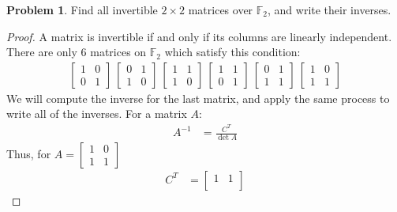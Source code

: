 \documentclass[12pt,reqno]{article}
\newcommand{\F}{\mathbb{F}}
\theoremstyle{definition}
\newtheorem{problem}{Problem}
\begin{document}
\newpage


\begin{problem}
Find all invertible $2\times2$ matrices over $\mathbb{F}_2$, and write their inverses.
\end{problem}

\begin{proof}
    A matrix is invertible if and only if its columns are linearly independent. There are only 6 matrices on $\F_2$ which satisfy this condition:
    \begin{align*}
        \begin{bmatrix}
            1 & 0\\
            0 & 1
        \end{bmatrix}\ 
        \begin{bmatrix}
            0 & 1\\
            1 & 0
        \end{bmatrix}\ 
        \begin{bmatrix}
            1 & 1\\
            1 & 0
        \end{bmatrix}\ 
        \begin{bmatrix}
            1 & 1\\
            0 & 1
        \end{bmatrix}\ 
        \begin{bmatrix}
            0 & 1\\
            1 & 1
        \end{bmatrix}\ 
        \begin{bmatrix}
            1 & 0\\
            1 & 1
        \end{bmatrix}
    \end{align*}
    We will compute the inverse for the last matrix, and apply the same process to write all of the inverses. For a matrix $A$:
    \begin{align*}
        A^{-1} &= \frac{C^T}{\det A}
    \end{align*}
    Thus, for $A = 
    \begin{bmatrix}
        1 & 0\\
        1 & 1
    \end{bmatrix}$
    \begin{align*}
        C^T &=
        \begin{bmatrix}
            1 & 1\\

\end{bmatrix}
\end{align*}
\end{proof}
\end{document}
